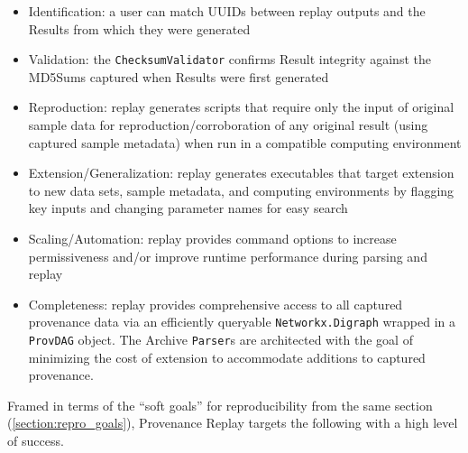 \begin{itemize}
    \item Identification: a user can match UUIDs between replay outputs and the
        Results from which they were generated
    \item Validation: the \texttt{ChecksumValidator} confirms Result integrity
        against the MD5Sums captured when Results were first generated
    \item Reproduction: replay generates scripts that require only the input
        of original sample data for reproduction/corroboration of any original
        result (using captured sample metadata) when run in a compatible computing
        environment
    \item Extension/Generalization: replay generates executables that target
        extension to new data sets, sample metadata, and computing environments by
        flagging key inputs and changing parameter names for easy search
    \item Scaling/Automation: replay provides command options to increase
        permissiveness and/or improve runtime performance during parsing and replay
    \item Completeness: replay provides comprehensive access to all captured
        provenance data via an efficiently queryable \texttt{Networkx.Digraph}
        wrapped in a \texttt{ProvDAG} object. The Archive \texttt{Parser}s are architected
        with the goal of minimizing the cost of extension to accommodate additions
        to captured provenance.
\end{itemize}

Framed in terms of the “soft goals” for reproducibility from the same section (\ref{section:repro_goals}),
Provenance Replay targets the following with a high level of success.

